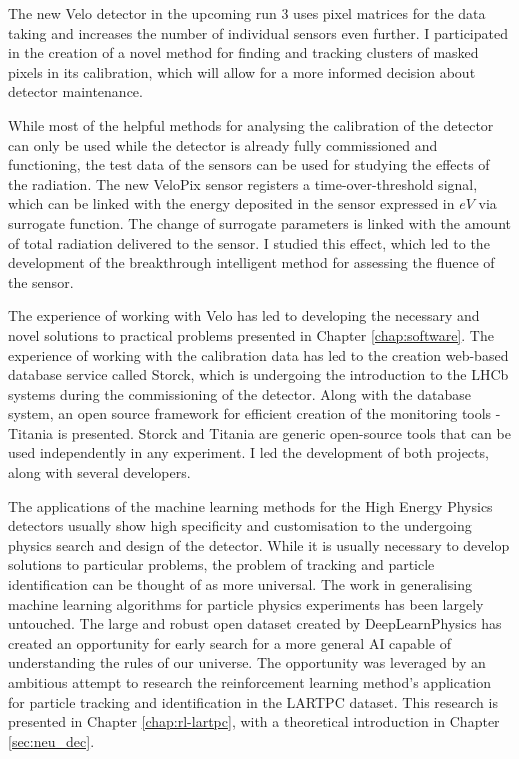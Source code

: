 The new Velo detector in the upcoming run 3 uses pixel matrices for the data taking and increases the number of individual sensors even further.
I participated in the creation of a novel method for finding and tracking clusters of masked pixels in its calibration, which will allow for a more informed decision about detector maintenance.

While most of the helpful methods for analysing the calibration of the detector can only be used while the detector is already fully commissioned and functioning, the test data of the sensors can be used for studying the effects of the radiation.
The new VeloPix sensor registers a time-over-threshold signal, which can be linked with the energy deposited in the sensor expressed in $eV$ via surrogate function. 
The change of surrogate parameters is linked with the amount of total radiation delivered to the sensor. I studied this effect, which led to the development of the breakthrough intelligent method for assessing the fluence of the sensor.

The experience of working with Velo has led to developing the necessary and novel solutions to practical problems presented in Chapter \ref{chap:software}.
The experience of working with the calibration data has led to the creation web-based database service called Storck, which is undergoing the introduction to the LHCb systems during the commissioning of the detector.
Along with the database system, an open source framework for efficient creation of the monitoring tools - Titania is presented.
Storck and Titania are generic open-source tools that can be used independently in any experiment.
I led the development of both  projects, along with several developers.

The applications of the machine learning methods for the High Energy Physics detectors usually show high specificity and customisation to the undergoing physics search and design of the detector.
While it is usually necessary to develop solutions to particular problems, the problem of tracking and particle identification can be thought of as more universal.
The work in generalising machine learning algorithms for particle physics experiments has been largely untouched.
The large and robust open dataset created by DeepLearnPhysics has created an opportunity for early search for a more general AI capable of understanding the rules of our universe.
The opportunity was leveraged by an ambitious attempt to research the reinforcement learning method's application for particle tracking and identification in the LARTPC dataset.
This research is presented in Chapter \ref{chap:rl-lartpc}, with a theoretical introduction in Chapter \ref{sec:neu_dec}.

